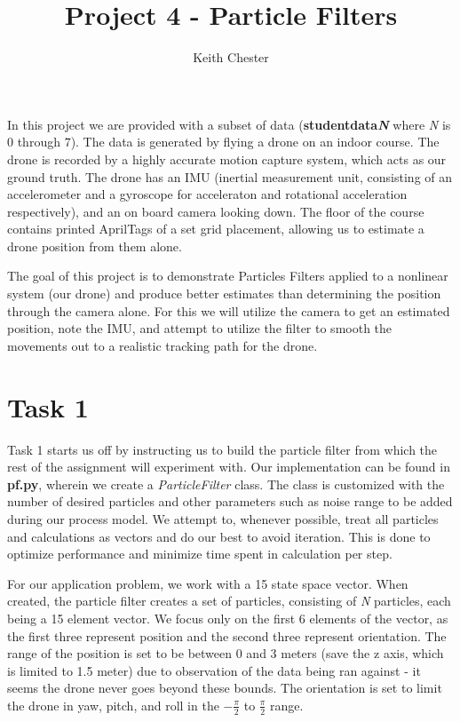 \documentclass{article}
\title{Project 4 - Particle Filters}
\author{Keith Chester}
\begin{document}
\maketitle


In this project we are provided with a subset of data (\textbf{studentdata\textit{N}} where \textit{N} is $0$ through $7$). The data is generated by flying a drone on an indoor course. The drone is recorded by a highly accurate motion capture system, which acts as our ground truth. The drone has an IMU (inertial measurement unit, consisting of an accelerometer and a gyroscope for acceleraton and rotational acceleration respectively), and an on board camera looking down. The floor of the course contains printed AprilTags of a set grid placement, allowing us to estimate a drone position from them alone.

The goal of this project is to demonstrate Particles Filters applied to a nonlinear system (our drone) and produce better estimates than determining the position through the camera alone. For this we will utilize the camera to get an estimated position, note the IMU, and attempt to utilize the filter to smooth the movements out to a realistic tracking path for the drone.

\section*{Task 1}

Task 1 starts us off by instructing us to build the particle filter from which the rest of the assignment will experiment with. Our implementation can be found in \textbf{pf.py}, wherein we create a \textit{ParticleFilter} class. The class is customized with the number of desired particles and other parameters such as noise range to be added during our process model. We attempt to, whenever possible, treat all particles and calculations as vectors and do our best to avoid iteration. This is done to optimize performance and minimize time spent in calculation per step.

For our application problem, we work with a 15 state space vector. When created, the particle filter creates a set of particles, consisting of \textit{N} particles, each being a 15 element vector. We focus only on the first 6 elements of the vector, as the first three represent position and the second three represent orientation. The range of the position is set to be between 0 and 3 meters (save the z axis, which is limited to 1.5 meter) due to observation of the data being ran against - it seems the drone never goes beyond these bounds. The orientation is set to limit the drone in yaw, pitch, and roll in the $-\frac{\pi}{2}$ to $\frac{\pi}{2}$ range.
\end{document}
